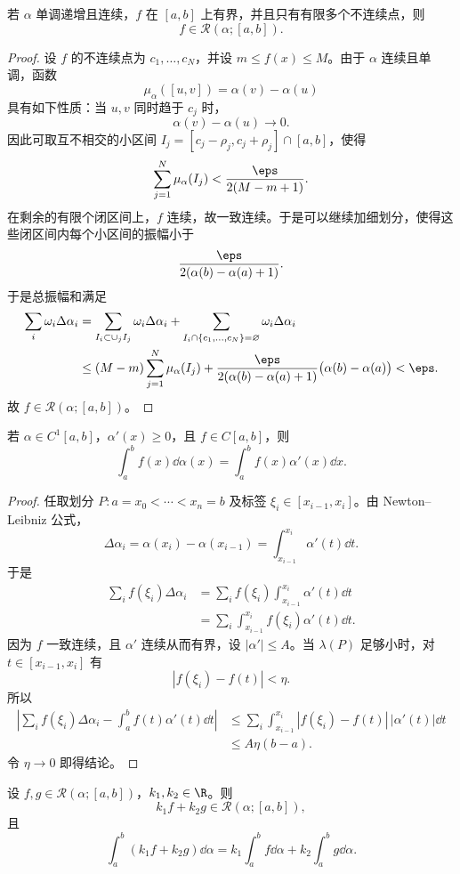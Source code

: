\begin{proposition}\label{prop:finite-discontinuities-alpha-continuous}
	若 $\alpha$ 单调递增且连续，$f$ 在 $[a,b]$ 上有界，并且只有有限多个不连续点，则
	\[
	f\in\mathcal R(\alpha;[a,b]).
	\]
\end{proposition}

\begin{proof}
	设 $f$ 的不连续点为 $c_1,\dots,c_N$，并设 $m\leq f(x)\leq M$。由于 $\alpha$ 连续且单调，函数
	\[
	\mu_\alpha([u,v])=\alpha(v)-\alpha(u)
	\]
	具有如下性质：当 $u,v$ 同时趋于 $c_j$ 时，
	\[
	\alpha(v)-\alpha(u)\to0.
	\]
	因此可取互不相交的小区间 $I_j=[c_j-\rho_j,c_j+\rho_j]\cap[a,b]$，使得
	\[
	\sum_{j=1}^N \mu_\alpha(I_j)<\frac{\eps}{2(M-m+1)}.
	\]
	在剩余的有限个闭区间上，$f$ 连续，故一致连续。于是可以继续加细划分，使得这些闭区间内每个小区间的振幅小于
	\[
	\frac{\eps}{2(\alpha(b)-\alpha(a)+1)}.
	\]
	于是总振幅和满足
	\[
	\begin{aligned}
		\sum_i \omega_i\Delta\alpha_i
		&=\sum_{I_i\subset \cup_j I_j}\omega_i\Delta\alpha_i
		+\sum_{I_i\cap \{c_1,\dots,c_N\}=\varnothing}\omega_i\Delta\alpha_i \\
		&\leq (M-m)\sum_{j=1}^N\mu_\alpha(I_j)
		+\frac{\eps}{2(\alpha(b)-\alpha(a)+1)}\bigl(\alpha(b)-\alpha(a)\bigr)
		<\eps.
	\end{aligned}
	\]
	故 $f\in\mathcal R(\alpha;[a,b])$。
\end{proof}
\begin{proposition}\label{prop:ordinary-reduction}
	若 $\alpha\in C^1[a,b]$，$\alpha'(x)\geq0$，且 $f\in C[a,b]$，则
	\[
	\int_a^b f(x)\dd\alpha(x)
	=\int_a^b f(x)\alpha'(x)\dd x.
	\]
\end{proposition}

\begin{proof}
	任取划分 $P:a=x_0<\cdots<x_n=b$ 及标签 $\xi_i\in[x_{i-1},x_i]$。由 Newton--Leibniz 公式，
	\[
	\Delta\alpha_i
	=\alpha(x_i)-\alpha(x_{i-1})
	=\int_{x_{i-1}}^{x_i}\alpha'(t)\dd t.
	\]
	于是
	\[
	\begin{aligned}
		\sum_i f(\xi_i)\Delta\alpha_i
		&=\sum_i f(\xi_i)\int_{x_{i-1}}^{x_i}\alpha'(t)\dd t \\
		&=\sum_i\int_{x_{i-1}}^{x_i}f(\xi_i)\alpha'(t)\dd t.
	\end{aligned}
	\]
	因为 $f$ 一致连续，且 $\alpha'$ 连续从而有界，设 $|\alpha'|\leq A$。当 $\lambda(P)$ 足够小时，对 $t\in[x_{i-1},x_i]$ 有
	\[
	|f(\xi_i)-f(t)|<\eta.
	\]
	所以
	\[
	\begin{aligned}
		\left|
		\sum_i f(\xi_i)\Delta\alpha_i
		-\int_a^b f(t)\alpha'(t)\dd t
		\right|
		&\leq \sum_i\int_{x_{i-1}}^{x_i}|f(\xi_i)-f(t)|\,|\alpha'(t)|\dd t \\
		&\leq A\eta(b-a).
	\end{aligned}
	\]
	令 $\eta\to0$ 即得结论。
\end{proof}
\begin{proposition}\label{prop:linear-integrand}
	设 $f,g\in\mathcal R(\alpha;[a,b])$，$k_1,k_2\in\R$。则
	\[
	k_1f+k_2g\in\mathcal R(\alpha;[a,b]),
	\]
	且
	\[
	\int_a^b (k_1f+k_2g)\dd\alpha
	=k_1\int_a^b f\dd\alpha+k_2\int_a^b g\dd\alpha.
	\]
\end{proposition}

